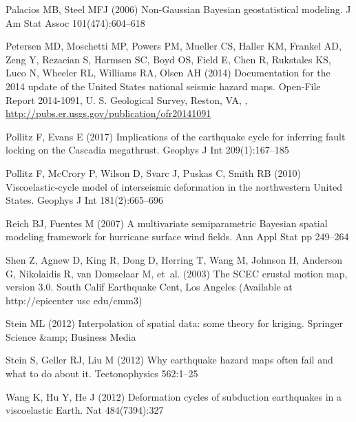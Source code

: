 {\begin{thebibliography}{33}
Palacios MB, Steel MFJ (2006) Non-{G}aussian {B}ayesian geostatistical
  modeling. J Am Stat Assoc 101(474):604--618

Petersen MD, Moschetti MP, Powers PM, Mueller CS, Haller KM, Frankel AD, Zeng
  Y, Rezaeian S, Harmsen SC, Boyd OS, Field E, Chen R, Rukstales KS, Luco N,
  Wheeler RL, Williams RA, Olsen AH (2014) Documentation for the 2014 update of
  the {U}nited {S}tates national seismic hazard maps. Open-File Report
  2014-1091, U. S. Geological Survey, Reston, VA, ,
  \urlprefix\url{http://pubs.er.usgs.gov/publication/ofr20141091}

Pollitz F, Evans E (2017) Implications of the earthquake cycle for inferring
  fault locking on the {C}ascadia megathrust. Geophys J Int 209(1):167--185

Pollitz F, McCrory P, Wilson D, Svarc J, Puskas C, Smith RB (2010)
  Viscoelastic-cycle model of interseismic deformation in the northwestern
  {U}nited {S}tates. Geophys J Int 181(2):665--696

Reich BJ, Fuentes M (2007) A multivariate semiparametric {B}ayesian spatial
  modeling framework for hurricane surface wind fields. Ann Appl Stat pp
  249--264

Shen Z, Agnew D, King R, Dong D, Herring T, Wang M, Johnson H, Anderson G,
  Nikolaidis R, van Domselaar M, et~al. (2003) The {SCEC} crustal motion map,
  version 3.0. South Calif Earthquake Cent, Los Angeles (Available at
  http://epicenter usc edu/cmm3)

Stein ML (2012) Interpolation of spatial data: some theory for kriging.
  Springer Science \&amp; Business Media

Stein S, Geller RJ, Liu M (2012) Why earthquake hazard maps often fail and what
  to do about it. Tectonophysics 562:1--25

Wang K, Hu Y, He J (2012) Deformation cycles of subduction earthquakes in a
  viscoelastic {E}arth. Nat 484(7394):327


\end{thebibliography}}

